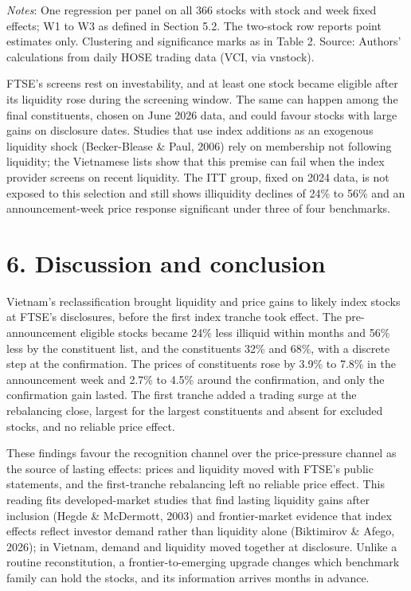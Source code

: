 \documentclass[review,authoryear,12pt]{elsarticle}
\begin{document}
\emph{Notes}: One regression per panel on all 366 stocks with stock and
week fixed effects; W1 to W3 as defined in Section 5.2. The two-stock
row reports point estimates only. Clustering and significance marks as
in Table 2. Source: Authors' calculations from daily HOSE trading data
(VCI, via vnstock).

FTSE's screens rest on investability, and at least one stock became
eligible after its liquidity rose during the screening window. The same
can happen among the final constituents, chosen on June 2026 data, and
could favour stocks with large gains on disclosure dates. Studies that
use index additions as an exogenous liquidity shock (Becker-Blease \&
Paul, 2006) rely on membership not following liquidity; the Vietnamese
lists show that this premise can fail when the index provider screens on
recent liquidity. The ITT group, fixed on 2024 data, is not exposed to
this selection and still shows illiquidity declines of 24\% to 56\% and
an announcement-week price response significant under three of four
benchmarks.

\hypertarget{discussion-and-conclusion}{%
\section*{6. Discussion and conclusion}}

Vietnam's reclassification brought liquidity and price gains to likely
index stocks at FTSE's disclosures, before the first index tranche took
effect. The pre-announcement eligible stocks became 24\% less illiquid
within months and 56\% less by the constituent list, and the
constituents 32\% and 68\%, with a discrete step at the confirmation.
The prices of constituents rose by 3.9\% to 7.8\% in the announcement
week and 2.7\% to 4.5\% around the confirmation, and only the
confirmation gain lasted. The first tranche added a trading surge at the
rebalancing close, largest for the largest constituents and absent for
excluded stocks, and no reliable price effect.

These findings favour the recognition channel over the price-pressure
channel as the source of lasting effects: prices and liquidity moved
with FTSE's public statements, and the first-tranche rebalancing left no
reliable price effect. This reading fits developed-market studies that
find lasting liquidity gains after inclusion (Hegde \& McDermott, 2003)
and frontier-market evidence that index effects reflect investor demand
rather than liquidity alone (Biktimirov \& Afego, 2026); in Vietnam,
demand and liquidity moved together at disclosure. Unlike a routine
reconstitution, a frontier-to-emerging upgrade changes which benchmark
family can hold the stocks, and its information arrives months in
advance.
\end{document}
